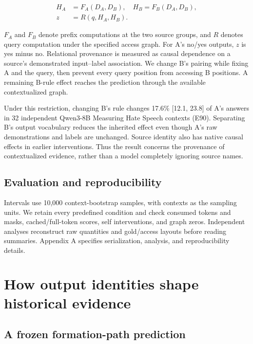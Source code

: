 \documentclass[11pt]{article}
\begin{document}
\[
\begin{aligned}H_A&=F_A(D_A,D_B),\quad H_B=F_B(D_A,D_B),\\ z&=R(q,H_A,H_B).\end{aligned}
\]

\(F_A\) and \(F_B\) denote prefix computations at the two source groups, and \(R\) denotes query computation under the specified access graph. For A's no/yes outputs, \(z\) is yes minus no. Relational provenance is measured as causal dependence on a source's demonstrated input--label association. We change B's pairing while fixing A and the query, then prevent every query position from accessing B positions. A remaining B-rule effect reaches the prediction through the available contextualized graph.

Under this restriction, changing B's rule changes 17.6\% {[}12.1, 23.8{]} of A's answers in 32 independent Qwen3-8B Measuring Hate Speech contexts (E90). Separating B's output vocabulary reduces the inherited effect even though A's raw demonstrations and labels are unchanged. Source identity also has native causal effects in earlier interventions. Thus the result concerns the provenance of contextualized evidence, rather than a model completely ignoring source names.

\subsection{Evaluation and reproducibility}\label{evaluation-and-reproducibility}

Intervals use 10,000 context-bootstrap samples, with contexts as the sampling units. We retain every predefined condition and check consumed tokens and masks, cached/full-token scores, self interventions, and graph zeros. Independent analyses reconstruct raw quantities and gold/access layouts before reading summaries. Appendix A specifies serialization, analysis, and reproducibility details.

\section{How output identities shape historical evidence}\label{how-output-identities-shape-historical-evidence}

\subsection{A frozen formation-path prediction}\label{a-frozen-formation-path-prediction}
\end{document}
